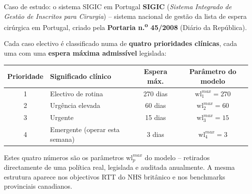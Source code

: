 \documentclass[10pt,aspectratio=169]{beamer}
\begin{document}
\begin{frame}{Caso de estudo: o sistema SIGIC em Portugal}
  \textbf{SIGIC} (\emph{Sistema Integrado de Gest\~ao de Inscritos
  para Cirurgia}) -- sistema nacional de gest\~ao da lista de espera
  cir\'urgica em Portugal, criado pela \textbf{Portaria
  n.\textsuperscript{o} 45/2008} (Di\'ario da Rep\'ublica).

  \vspace{0.4em}
  Cada caso electivo \'{e} classificado numa de \textbf{quatro
  prioridades cl\'inicas}, cada uma com uma \textbf{espera m\'axima
  admiss\'ivel} legislada:

  \vspace{0.3em}
  \begin{center}\small
  \begin{tabular}{clcc}
    \toprule
    Prioridade & Significado cl\'inico & Espera m\'ax. & Par\^ametro do modelo \\
    \midrule
    1 & Electivo de rotina & 270 dias & $\text{wl}^{max}_1 = 270$ \\
    2 & Urg\^encia elevada & 60 dias  & $\text{wl}^{max}_2 = 60$  \\
    3 & Urgente            & 15 dias  & $\text{wl}^{max}_3 = 15$  \\
    4 & Emergente (operar esta semana) & 3 dias & $\text{wl}^{max}_4 = 3$ \\
    \bottomrule
  \end{tabular}
  \end{center}
  \vspace{0.3em}
  \footnotesize Estes quatro n\'umeros s\~ao os par\^ametros
  $\text{wl}^{max}_p$ do modelo -- retirados directamente de uma
  pol\'itica real, legislada e auditada anualmente. A mesma estrutura
  aparece nos objectivos RTT do NHS brit\^anico e nos benchmarks
  provinciais canadianos.
\end{frame}
\end{document}
